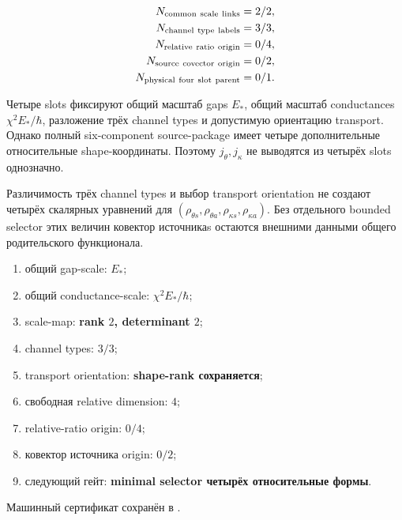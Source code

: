 \begin{equation}
 \begin{aligned}
 N_{\rm common\ scale\ links}&=2/2,\\
 N_{\rm channel\ type\ labels}&=3/3,\\
 N_{\rm relative\ ratio\ origin}&=0/4,\\
 N_{\rm source\ covector\ origin}&=0/2,\\
 N_{\rm physical\ four\ slot\ parent}&=0/1.
 \end{aligned}
 \label{eq:v9-kms-covector-origin-ledger}
\end{equation}

\begin{theorem}
Четыре slots фиксируют общий масштаб gaps $E_*$, общий масштаб
conductances $\chi^2E_*/\hbar$, разложение трёх channel types и допустимую
ориентацию transport. Однако полный six-component source-package имеет
четыре дополнительные относительные shape-координаты. Поэтому
$j_\theta,j_\kappa$ не выводятся из четырёх slots однозначно.
\end{theorem}

\begin{nogocriterion}
Различимость трёх channel types и выбор transport orientation не создают
четырёх скалярных уравнений для
$(\rho_{\theta s},\rho_{\theta a},\rho_{\kappa s},\rho_{\kappa a})$.
Без отдельного bounded selector этих величин ковектор источникаs остаются
внешними данными общего родительского функционала.
\end{nogocriterion}

\begin{protocol}\begin{enumerate}
\item общий gap-scale: \textbf{$E_*$};
\item общий conductance-scale: \textbf{$\chi^2E_*/\hbar$};
\item scale-map: \textbf{rank $2$, determinant $2$};
\item channel types: \textbf{$3/3$};
\item transport orientation: \textbf{shape-rank сохраняется};
\item свободная relative dimension: \textbf{$4$};
\item relative-ratio origin: \textbf{$0/4$};
\item ковектор источника origin: \textbf{$0/2$};
\item следующий гейт: \textbf{minimal selector четырёх относительные формы}.
\end{enumerate}\end{protocol}

Машинный сертификат сохранён в
.